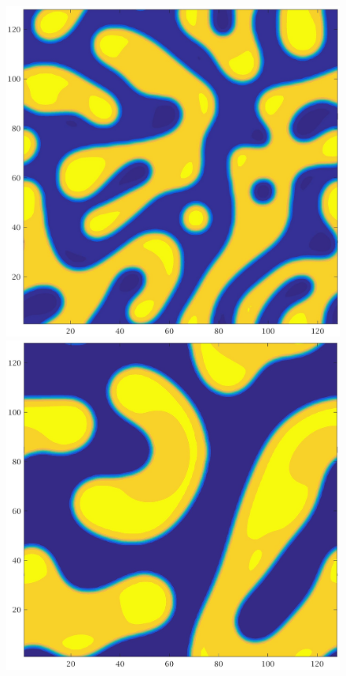 \documentclass[a4paper,6pt]{article}
\begin{document}
\begin{figure}[H]
        \begin{minipage}[b]{.32\linewidth}        
                \centering
                \includegraphics[width=1\textwidth]{pics/C2_t4.jpg}
        \end{minipage}
        \begin{minipage}[b]{.32\linewidth}
                \centering
                \includegraphics[width=1\textwidth]{pics/C2_t5.jpg}

\end{minipage}
\end{figure}
\end{document}
